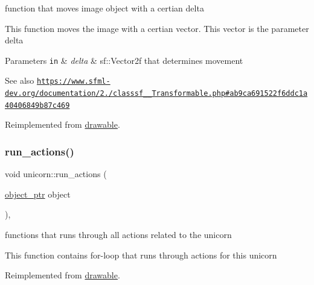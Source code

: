function that moves image object with a certian delta 

This function moves the image with a certian vector. This vector is the parameter delta


\begin{DoxyParams}[1]{Parameters}
\mbox{\tt in}  & {\em delta} & sf\+::\+Vector2f that determines movement\\
\hline
\end{DoxyParams}
\begin{DoxySeeAlso}{See also}
\href{https://www.sfml-dev.org/documentation/2.0/classsf_1_1Transformable.php#ab9ca691522f6ddc1a40406849b87c469}{\tt https\+://www.\+sfml-\/dev.\+org/documentation/2./classsf\+\_\+\_\+Transformable.\+php\#ab9ca691522f6ddc1a40406849b87c469} 
\end{DoxySeeAlso}


Reimplemented from \hyperlink{classdrawable_ad0d3930c045cc6776aa2c3965be32491}{drawable}.

\mbox{\label{classunicorn_aadb47a9981c46d6add8704074df117df}} 
\subsubsection{\texorpdfstring{run\+\_\+actions()}{run\_actions()}}
{\footnotesize\ttfamily void unicorn\+::run\+\_\+actions (\begin{DoxyParamCaption}\item[{\hyperlink{typedefs_8hpp_aab5add95f06d2ba25dbfed8eb07274fa}{object\+\_\+ptr}}]{object }\end{DoxyParamCaption})\hspace{0.3cm}{\ttfamily [override]}, {\ttfamily [virtual]}}



functions that runs through all actions related to the unicorn 

This function contains for-\/loop that runs through actions for this unicorn 

Reimplemented from \hyperlink{classdrawable_a715df01a318331e5611a2b0ad30109ff}{drawable}.

\mbox{\label{classunicorn_af0e2581c426b4b1e32f8a7b484b4e242}} 
